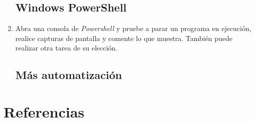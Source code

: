 \documentclass[paper=a4, fontsize=11pt]{scrartcl} %
\numberwithin{equation}{section} %
\numberwithin{figure}{section} %
\numberwithin{table}{section} %
\begin{document}
\begin{enumerate}
	\subsection{Windows PowerShell}
		\item Abra una consola de \textit{Powershell} y pruebe a parar un programa en ejecución,
		realice capturas de pantalla y comente lo que muestra. También puede realizar otra tarea de
		su elección.
	
	\subsection{Más automatización}
	
\end{enumerate}

\newpage
\section{Referencias}

\end{document}
